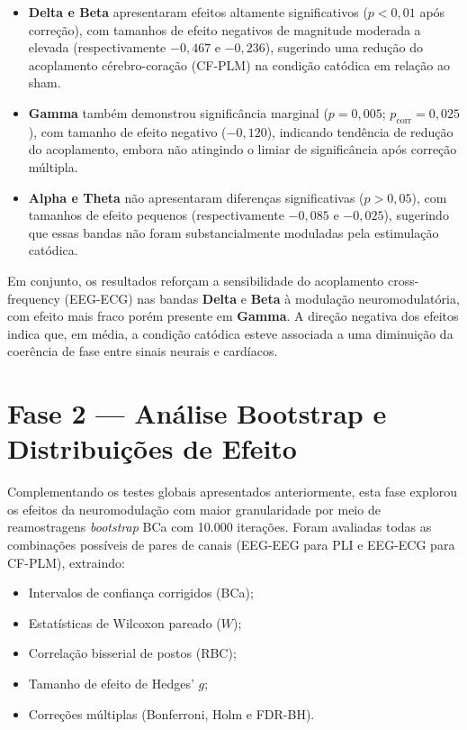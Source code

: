 \begin{itemize}
  \item \textbf{Delta e Beta} apresentaram efeitos altamente significativos ($p < 0{,}01$ após correção), com tamanhos de efeito negativos de magnitude moderada a elevada (respectivamente $-0{,}467$ e $-0{,}236$), sugerindo uma redução do acoplamento cérebro-coração (CF-PLM) na condição catódica em relação ao sham.
  \item \textbf{Gamma} também demonstrou significância marginal ($p = 0{,}005$; $p_{\text{corr}} = 0{,}025$), com tamanho de efeito negativo ($-0{,}120$), indicando tendência de redução do acoplamento, embora não atingindo o limiar de significância após correção múltipla.
  \item \textbf{Alpha e Theta} não apresentaram diferenças significativas ($p > 0{,}05$), com tamanhos de efeito pequenos (respectivamente $-0{,}085$ e $-0{,}025$), sugerindo que essas bandas não foram substancialmente moduladas pela estimulação catódica.
\end{itemize}

Em conjunto, os resultados reforçam a sensibilidade do acoplamento cross-frequency (EEG-ECG) nas bandas \textbf{Delta} e \textbf{Beta} à modulação neuromodulatória, com efeito mais fraco porém presente em \textbf{Gamma}. A direção negativa dos efeitos indica que, em média, a condição catódica esteve associada a uma diminuição da coerência de fase entre sinais neurais e cardíacos.

\section{Fase 2 — Análise Bootstrap e Distribuições de Efeito}

Complementando os testes globais apresentados anteriormente, esta fase explorou os efeitos da neuromodulação com maior granularidade por meio de reamostragens \textit{bootstrap} BCa com 10.000 iterações. Foram avaliadas todas as combinações possíveis de pares de canais (EEG-EEG para PLI e EEG-ECG para CF-PLM), extraindo:
\begin{itemize}
  \item Intervalos de confiança corrigidos (BCa);
  \item Estatísticas de Wilcoxon pareado ($W$);
  \item Correlação bisserial de postos (RBC);
  \item Tamanho de efeito de Hedges' $g$;
  \item Correções múltiplas (Bonferroni, Holm e FDR-BH).
\end{itemize}

